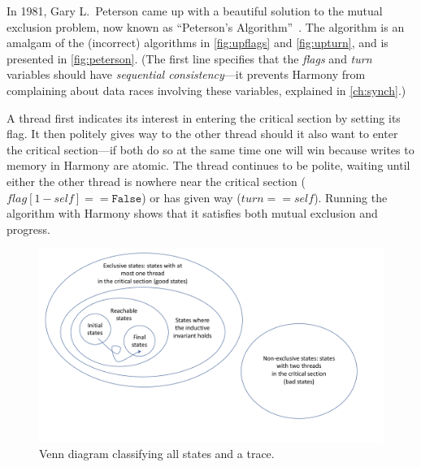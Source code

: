 \documentclass{report}
\begin{document}
%
In 1981, Gary L.~Peterson came up with a beautiful solution to the mutual exclusion
problem, now known as ``Peterson's Algorithm''~\cite{Peterson81}.
The algorithm is an amalgam of the (incorrect) algorithms in
\autoref{fig:upflags} and \autoref{fig:upturn}, and is presented
in \autoref{fig:peterson}.
(The first line specifies that the \textit{flags} and \textit{turn}
variables should have \emph{sequential consistency}---it prevents
Harmony from complaining about data races involving these variables,
explained in \autoref{ch:synch}.)

A thread first indicates its interest in entering the critical section
by setting its flag.
It then politely gives way to the other thread should it also want to
enter the critical section---if both do so at the same time one will
win because writes to memory in Harmony are atomic.
The thread continues to be polite, waiting
until either the other thread is nowhere near the critical section
($\mathit{flag}[1 - \mathit{self}] == \mathtt{False}$) or has given way
($\mathit{turn} == \mathit{self}$).
Running the algorithm with Harmony shows that it satisfies both mutual
exclusion and progress.

\begin{figure}
\begin{center}
\includegraphics[width=6in]{figures/states-crop.pdf}
\end{center}
\caption{Venn diagram classifying all states and a trace.}
\label{fig:states}
\end{figure}

%
%
\end{document}

